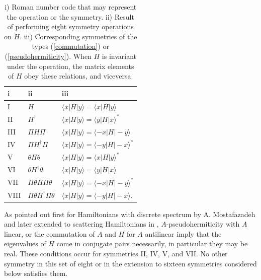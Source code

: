 %
%
%
\begin{table}[t]
\caption{
{i}) Roman number code that may represent the operation or the symmetry.
{ii}) Result of performing eight symmetry operations on $H$.
 {iii}) Corresponding symmetries of the types (\ref{commutation}) or (\ref{pseudohermiticity}).
When $H$ is invariant under the operation, the matrix elements of $H$ obey these relations, and viceversa.
 }
\label{table11}
\begin{tabular}{ lll }
  i&ii&iii\\
  \hline
   I     &     $H$                               &$\langle x|H|y \rangle=\langle x|H|y \rangle$                  \\
   II    &     $H^{\dagger}$                  & $\langle x|H|y \rangle=\langle y|H|x \rangle^{*}$         \\
   III   &     $\Pi H\Pi $                     & $\langle x|H|y \rangle=\langle -x|H|-y \rangle$               \\
   IV    &    $\Pi H^{\dagger}\Pi$         & $\langle x|H|y \rangle=\langle -y|H|-x \rangle^{*}$      \\
   V     &    $\theta H\theta$               & $\langle x|H|y \rangle=\langle x|H|y \rangle^{*}$         \\
   VI    &    $\theta H^{\dagger}\theta$        & $\langle x|H|y \rangle=\langle y|H|x \rangle$     \\
   VII   &    $\Pi\theta H\Pi\theta$    & $\langle x|H|y \rangle=\langle -x|H|-y \rangle^{*}$         \\
   VIII  &    $\Pi\theta H^{\dagger}\Pi\theta$ & $\langle x|H|y \rangle=\langle -y|H|-x \rangle$.\\


\end{tabular}

\end{table}
%
%

As pointed out first for Hamiltonians with discrete spectrum by A. Mostafazadeh \cite{Mostafazadeh2002,Mostafazadeh2002a,Mostafazadeh2002b} and later extended to scattering
Hamiltonians in \cite{Simon2019a},
$A$-pseudohermiticity with $A$ linear, or the commutation of $A$ and $H$ for $A$ antilinear
imply that the eigenvalues of $H$ come in conjugate pairs necessarily, in particular they
may be real.
These conditions occur for symmetries II, IV, V, and VII.
No other symmetry in this set of eight or in the extension to sixteen symmetries
considered below satisfies them.





